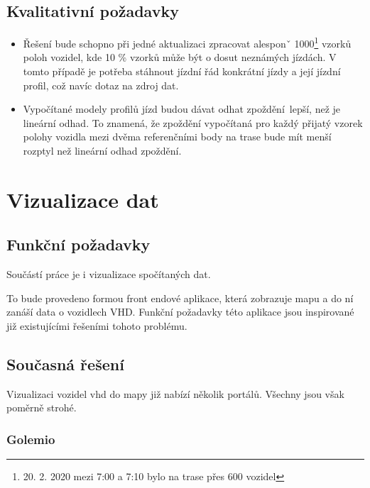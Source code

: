 \subsection{Kvalitativní požadavky}

\begin{itemize}

	\item
	Řešení bude schopno při jedné aktualizaci zpracovat alesponˇ 1000\footnote{20. 2. 2020 mezi 7:00 a 7:10 bylo na trase přes 600 vozidel} vzorků poloh vozidel, kde 10 \% vzorků může být o dosut neznámých jízdách. V tomto případě je potřeba stáhnout jízdní řád konkrátní jízdy a její jízdní profil, což navíc dotaz na zdroj dat.

	\item
	Vypočítané modely profilů jízd budou dávat odhat zpoždění lepší, než je lineární odhad. To znamená, že zpoždění vypočítaná pro každý přijatý vzorek polohy vozidla mezi dvěma referenčními body na trase bude mít menší rozptyl než lineární odhad zpoždění.

\end{itemize}




\section{Vizualizace dat}

\subsection{Funkční požadavky}

Součástí práce je i vizualizace spočítaných dat.

\bigbreak

To bude provedeno formou front endové aplikace, která zobrazuje mapu a do ní zanáší data o vozidlech VHD. Funkční požadavky této aplikace jsou inspirované již existujícími řešeními tohoto problému.

\subsection{Současná řešení} \label{chapter:soucasna_reseni_front_end}

Vizualizaci vozidel \gls{vhd} do mapy již nabízí několik portálů. Všechny jsou však poměrně strohé.

\subsubsection{Golemio}

